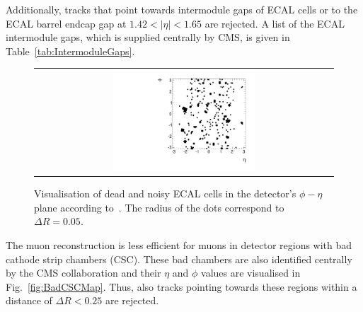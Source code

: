 Additionally, tracks that point towards intermodule gaps of ECAL cells or to the ECAL barrel endcap gap at $1.42<|\eta|<1.65$ are rejected.
A list of the ECAL intermodule gaps, which is supplied centrally by CMS, is given in Table~\ref{tab:IntermoduleGaps}.

\begin{figure}[!b]
  \centering 
  \begin{tabular}{c}
    \includegraphics[width=0.49\textwidth]{figures/analysis/DeadECALMap2.pdf}
  \end{tabular}
  \caption{Visualisation of dead and noisy ECAL cells in the detector's $\phi - \eta$ plane according to~\cite{bib:CMS:DT_Thesis,bib:CMS:DT_8TeV_AN}.
           The radius of the dots correspond to $\Delta R=0.05$.}
  \label{fig:DeadECALmap}
\end{figure}




The muon reconstruction is less efficient for muons in detector regions with bad cathode strip chambers (CSC).
These bad chambers are also identified centrally by the CMS collaboration and their $\eta$ and $\phi$ values are visualised in Fig.~\ref{fig:BadCSCMap}.
Thus, also tracks pointing towards these regions within a distance of $\Delta R<0.25$ are rejected.

\renewcommand{\arraystretch}{1.5}
\begin{table}[!b]
\centering
\caption{Intermodule ECAL gaps.}
\label{tab:IntermoduleGaps}
\end{table}  

